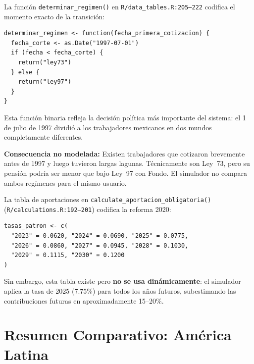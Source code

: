 \documentclass[11pt,a4paper]{report}
\begin{document}
\begin{tcolorbox}[colback=orange!5!white, colframe=orange!75!black, title=\textbf{Aplicaci\'on en C\'odigo: determinar\_regimen() y la Transici\'on Hist\'orica}]
La funci\'on \texttt{determinar\_regimen()} en \texttt{R/data\_tables.R:205--222} codifica el momento exacto de la transici\'on:

\begin{lstlisting}
determinar_regimen <- function(fecha_primera_cotizacion) {
  fecha_corte <- as.Date("1997-07-01")
  if (fecha < fecha_corte) {
    return("ley73")
  } else {
    return("ley97")
  }
}
\end{lstlisting}

Esta funci\'on binaria refleja la decisi\'on pol\'itica m\'as importante del sistema: el 1 de julio de 1997 dividi\'o a los trabajadores mexicanos en dos mundos completamente diferentes.

\textbf{Consecuencia no modelada:} Existen trabajadores que cotizaron brevemente antes de 1997 y luego tuvieron largas lagunas. T\'ecnicamente son Ley~73, pero su pensi\'on podr\'ia ser menor que bajo Ley~97 con Fondo. El simulador no compara ambos reg\'imenes para el mismo usuario.

La tabla de aportaciones en \texttt{calculate\_aportacion\_obligatoria()} (\texttt{R/calculations.R:192--201}) codifica la reforma 2020:
\begin{lstlisting}
tasas_patron <- c(
  "2023" = 0.0620, "2024" = 0.0690, "2025" = 0.0775,
  "2026" = 0.0860, "2027" = 0.0945, "2028" = 0.1030,
  "2029" = 0.1115, "2030" = 0.1200
)
\end{lstlisting}

Sin embargo, esta tabla existe pero \textbf{no se usa din\'amicamente}: el simulador aplica la tasa de 2025 (7.75\%) para todos los a\~nos futuros, subestimando las contribuciones futuras en aproximadamente 15--20\%.
\end{tcolorbox}


\section{Resumen Comparativo: Am\'erica Latina}
\end{document}
